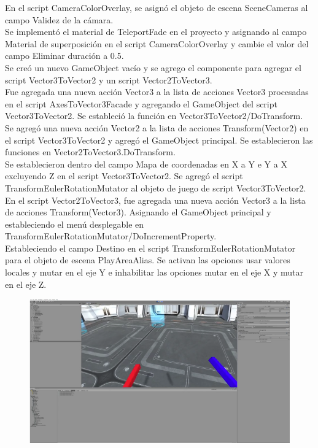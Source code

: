 En el script CameraColorOverlay, se asignó el objeto de escena SceneCameras al campo Validez de la cámara.\\

Se implementó el material de TeleportFade en el proyecto y asignando al campo Material de superposición en el script CameraColorOverlay y cambie el valor del campo Eliminar duración a 0.5.\\

Se creó un nuevo GameObject vacío y se agrego el componente para agregar el script Vector3ToVector2 y un script Vector2ToVector3.\\

Fue agregada una nueva acción Vector3 a la lista de acciones Vector3 procesadas en el script AxesToVector3Facade y agregando el GameObject del script Vector3ToVector2. Se estableció la función en Vector3ToVector2/DoTransform.\\

Se agregó una nueva acción Vector2 a la lista de acciones Transform(Vector2) en el script Vector3ToVector2 y agregó el GameObject principal. Se establecieron las funciones en Vector2ToVector3\/.DoTransform.\\

Se establecieron dentro del campo Mapa de coordenadas en X a Y e Y a X excluyendo Z en el script Vector3ToVector2. Se agregó el script TransformEulerRotationMutator al objeto de juego de script Vector3ToVector2.\\

En el script Vector2ToVector3, fue agregada una nueva acción Vector3 a la lista de acciones Transform(Vector3). Asignando el GameObject principal y estableciendo el menú desplegable en TransformEulerRotationMutator/DoIncrementProperty.\\

Estableciendo el campo Destino en el script TransformEulerRotationMutator para el objeto de escena PlayAreaAlias. Se activan las opciones usar valores locales y mutar en el eje Y e inhabilitar las opciones mutar en el eje X y mutar en el eje Z.\\
\begin{figure}[H]
	\begin{center}
 		\includegraphics[width = .5\textwidth]{source/images/image47.png}
	\end{center} 
\end{figure}

